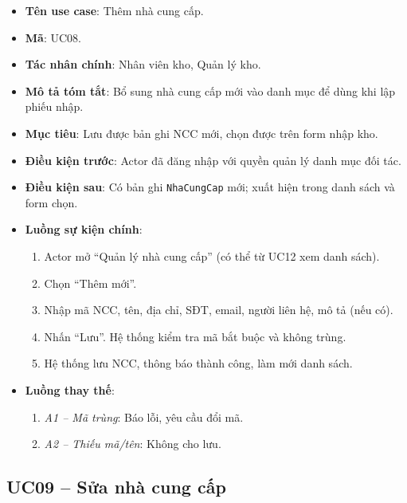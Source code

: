 \begin{itemize}[leftmargin=1.5cm]
    \item \textbf{Tên use case}: Thêm nhà cung cấp.
    \item \textbf{Mã}: UC08.
    \item \textbf{Tác nhân chính}: Nhân viên kho, Quản lý kho.
    \item \textbf{Mô tả tóm tắt}: Bổ sung nhà cung cấp mới vào danh mục để dùng khi lập phiếu nhập.
    \item \textbf{Mục tiêu}: Lưu được bản ghi NCC mới, chọn được trên form nhập kho.
    \item \textbf{Điều kiện trước}: Actor đã đăng nhập với quyền quản lý danh mục đối tác.
    \item \textbf{Điều kiện sau}: Có bản ghi \texttt{NhaCungCap} mới; xuất hiện trong danh sách và form chọn.
    \item \textbf{Luồng sự kiện chính}:
    \begin{enumerate}
        \item Actor mở ``Quản lý nhà cung cấp'' (có thể từ UC12 xem danh sách).
        \item Chọn ``Thêm mới''.
        \item Nhập mã NCC, tên, địa chỉ, SĐT, email, người liên hệ, mô tả (nếu có).
        \item Nhấn ``Lưu''. Hệ thống kiểm tra mã bắt buộc và không trùng.
        \item Hệ thống lưu NCC, thông báo thành công, làm mới danh sách.
    \end{enumerate}
    \item \textbf{Luồng thay thế}:
    \begin{enumerate}
        \item \textit{A1 -- Mã trùng}: Báo lỗi, yêu cầu đổi mã.
        \item \textit{A2 -- Thiếu mã/tên}: Không cho lưu.
    \end{enumerate}
\end{itemize}

\subsection{UC09 -- Sửa nhà cung cấp}

